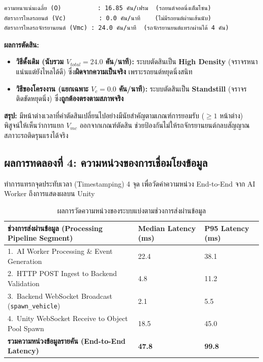 \documentclass[12pt,a4paper]{report}
\begin{document}
\begin{lstlisting}[caption={ค่าพารามิเตอร์สภาพจราจรช่วงวินาทีที่ 10--20 ในการทดสอบ Experiment 3}]
ความหนาแน่นเฉลี่ย (O)          : 16.85 คัน/เฟรม  (รถยนต์จอดนิ่งเต็มโซน)
อัตราการไหลรถยนต์ (Vc)         : 0.0 คัน/นาที    (ไม่มีรถยนต์ผ่านเส้นนับ)
อัตราการไหลรถจักรยานยนต์ (Vmc) : 24.0 คัน/นาที  (รถจักรยานยนต์แทรกผ่านได้ 4 คัน)
\end{lstlisting}

\noindent\textbf{ผลการตัดสิน:}

\begin{itemize}
  \item \textbf{วิธีดั้งเดิม (นับรวม $V_{total} = 24.0$ คัน/นาที):}
        ระบบตัดสินเป็น \textbf{High Density}
        (จราจรหนาแน่นแต่ยังไหลได้ดี)
        ซึ่ง\textbf{ผิดจากความเป็นจริง} เพราะรถยนต์หยุดนิ่งสนิท

  \item \textbf{วิธีของโครงงาน (แยกเฉพาะ $V_c = 0.0$ คัน/นาที):}
        ระบบตัดสินเป็น \textbf{Standstill}
        (จราจรติดขัดหยุดนิ่ง)
        ซึ่ง\textbf{ถูกต้องตรงตามสภาพจริง}
\end{itemize}

\noindent\textbf{สรุป:}
มีหน้าต่างเวลาที่คำตัดสินเปลี่ยนไปอย่างมีนัยสำคัญตามเกณฑ์การยอมรับ
($\geq 1$ หน้าต่าง)
พิสูจน์ให้เห็นว่าการแยก $V_{mc}$ ออกจากเกณฑ์ตัดสิน
ช่วยป้องกันไม่ให้รถจักรยานยนต์กลบสัญญาณสภาวะรถติดรุนแรงได้จริง

\subsection{ผลการทดลองที่ 4: ความหน่วงของการเชื่อมโยงข้อมูล}
\label{subsec:exp4}

ทำการแทรกจุดประทับเวลา (Timestamping) 4 จุด
เพื่อวัดค่าความหน่วง End-to-End จาก AI Worker ถึงการแสดงผลบน Unity

\begin{table}[H]
  \centering
  \caption{ผลการวัดความหน่วงของระบบแบ่งตามช่วงการส่งผ่านข้อมูล}
  \label{tab:latency}
  \begin{tabular}{L{8.2cm} C{3.0cm} C{3.0cm}}
    \toprule
    \textbf{ช่วงการส่งผ่านข้อมูล (Processing Pipeline Segment)} &
    \textbf{Median Latency (ms)} &
    \textbf{P95 Latency (ms)} \\
    .\ AI Worker Processing \& Event Generation              & 22.4          & 38.1 \\
    2.\ HTTP POST Ingest to Backend Validation                & 4.8           & 11.2 \\
    3.\ Backend WebSocket Broadcast (\texttt{spawn\_vehicle}) & 2.1           & 5.5  \\
    4.\ Unity WebSocket Receive to Object Pool Spawn          & 18.5          & 45.0 \\
    \midrule
    \textbf{รวมความหน่วงข้อมูลรายคัน (End-to-End Latency)}   & \textbf{47.8} & \textbf{99.8} \\
    \bottomrule
  \end{tabular}
\end{table}
\end{document}
